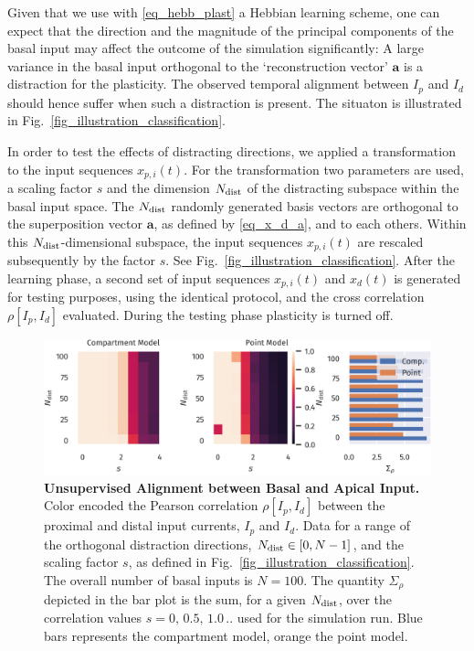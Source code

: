 \documentclass[utf8]{frontiersSCNS} %
\begin{document}
Given that we use with \eqref{eq_hebb_plast}
a Hebbian learning scheme, one can expect that
the direction and the magnitude of the principal 
components of the basal input may affect the
outcome of the simulation significantly:
A large variance in the basal input 
orthogonal to the `reconstruction vector' $\mathbf{a}$ 
is a distraction for the plasticity. The
observed temporal alignment between $I_p$ and 
$I_d$ should hence suffer when such a 
distraction is present. The situaton is illustrated 
in Fig.~\ref{fig_illustration_classification}.

In order to test the effects of distracting directions,
we applied a transformation to the input sequences $x_{p,i}(t)$.
For the transformation two parameters are used,
a scaling factor $s$ and the dimension $N_{\rm dist}$ 
of the distracting subspace within the basal input 
space. The $N_{\rm dist}$ randomly generated
basis vectors are orthogonal to the superposition
vector $\mathbf{a}$, as defined by \eqref{eq_x_d_a},
and to each others. Within this $N_{\rm dist}$-dimensional 
subspace, the input sequences $x_{p,i}(t)$ are
rescaled subsequently by the factor $s$. 
See Fig.~\ref{fig_illustration_classification}.
After the learning phase, a second set of input 
sequences $x_{p,i}(t)$ and $x_d(t)$ is generated for 
testing purposes, using the identical protocol, and
the cross correlation $\rho[I_p,I_d]$ 
evaluated. During the testing phase plasticity is 
turned off.

\begin{figure}[t]
\centering
\includegraphics[width=1.0\columnwidth]{corr_dimension_scaling_high_input_dim}
\caption{{\bf Unsupervised Alignment between 
Basal and Apical Input.} Color
encoded the Pearson correlation $\rho[I_p,I_d]$ 
between the proximal and distal input currents,
$I_p$ and $I_d$. Data for a range of the orthogonal 
distraction directions, $N_{\rm dist}\in[0,N-1]$, 
and the scaling factor $s$, as defined in
Fig.~\ref{fig_illustration_classification}.
The overall number of basal inputs is $N=100$.
The quantity $\Sigma_{\rho}$ depicted in the bar
plot is the sum, for a given $N_{\rm dist}$,
over the correlation values $s=0,\,0.5,\,1.0\,..$ 
used for the simulation run. Blue bars represents 
the compartment model, orange the point model.}
\label{fig_corr_dimension_scaling}
\end{figure}
\end{document}
